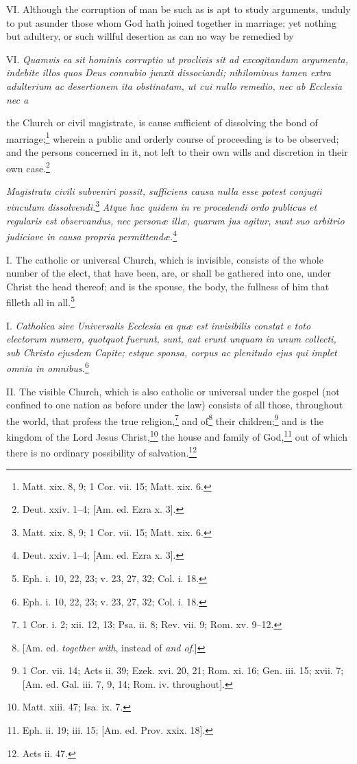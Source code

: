 VI. Although the corruption of man be such as is apt to study arguments, unduly to put asunder those whom God hath joined together in marriage; yet nothing but adultery, or such willful desertion as can no way be remedied by

VI. \emph{Quamvis ea sit hominis corruptio ut proclivis sit ad excogitandum argumenta, indebite illos quos Deus connubio junxit dissociandi; nihilominus tamen extra adulterium ac desertionem ita obstinatam, ut cui nullo remedio, nec ab Ecclesia nec a }

the Church or civil magistrate, is cause sufficient of dissolving the bond of marriage;\footnote{Matt. xix. 8, 9; 1 Cor. vii. 15; Matt. xix. 6.} wherein a public and orderly course of proceeding is to be observed; and the persons concerned in it, not left to their own wills and discretion in their own case.\footnote{Deut. xxiv. 1–4; [Am. ed. Ezra x. 3].}

\emph{Magistratu civili subveniri possit, sufficiens causa nulla esse potest conjugii vinculum dissolvendi.}\footnote{Matt. xix. 8, 9; 1 Cor. vii. 15; Matt. xix. 6.}\emph{ Atque hac quidem in re procedendi ordo publicus et regularis est observandus, nec personæ illæ, quarum jus agitur, sunt suo arbitrio judiciove in causa propria permittendæ.}\footnote{Deut. xxiv. 1–4; [Am. ed. Ezra x. 3].}


I. The catholic or universal Church, which is invisible, consists of the whole number of the elect, that have been, are, or shall be gathered into one, under Christ the head thereof; and is the spouse, the body, the fullness of him that filleth all in all.\footnote{Eph. i. 10, 22, 23; v. 23, 27, 32; Col. i. 18.}

I. \emph{Catholica sive Universalis Ecclesia ea quæ est invisibilis constat e toto electorum numero, quotquot fuerunt, sunt, aut erunt unquam in unum collecti, sub Christo ejusdem Capite; estque sponsa, corpus ac plenitudo ejus qui implet omnia in omnibus.}\footnote{Eph. i. 10, 22, 23; v. 23, 27, 32; Col. i. 18.}

II. The visible Church, which is also catholic or universal under the gospel (not confined to one nation as before under the law) consists of all those, throughout the world, that profess the true religion,\footnote{1 Cor. i. 2; xii. 12, 13; Psa. ii. 8; Rev. vii. 9; Rom. xv. 9–12.} and of\footnote{[Am. ed. \emph{together with}, instead of \emph{and of}.]} their children;\footnote{1 Cor. vii. 14; Acts ii. 39; Ezek. xvi. 20, 21; Rom. xi. 16; Gen. iii. 15; xvii. 7; [Am. ed. Gal. iii. 7, 9, 14; Rom. iv. throughout].} and is the kingdom of the Lord Jesus Christ,\footnote{Matt. xiii. 47; Isa. ix. 7.} the house and family of God,\footnote{Eph. ii. 19; iii. 15; [Am. ed. Prov. xxix. 18].} out of which there is no ordinary possibility of salvation.\footnote{Acts ii. 47.}


